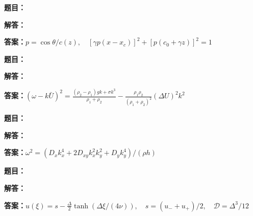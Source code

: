 \documentclass[lang=cn,color=blue,11pt]{elegantbook}
\begin{document}
\par\smallskip\noindent\hrulefill\par\medskip
{}\par
\noindent\textbf{题目：}
\par\noindent\textbf{解答：}
\par\noindent\textbf{答案：}\(\displaystyle p=\cos\theta/c(z),\quad [\gamma p(x-x_c)]^2+[p(c_0+\gamma z)]^2=1\)\par
\par\smallskip\noindent\hrulefill\par\medskip
{}\par
\noindent\textbf{题目：}
\par\noindent\textbf{解答：}
\par\noindent\textbf{答案：}\(\displaystyle (\omega-k\bar U)^2=\frac{(\rho_2-\rho_1)gk+\sigma k^3}{\rho_1+\rho_2}-\frac{\rho_1\rho_2}{(\rho_1+\rho_2)^2}(\Delta U)^2k^2\)\par
\par\smallskip\noindent\hrulefill\par\medskip
{}\par
\noindent\textbf{题目：}
\par\noindent\textbf{解答：}
\par\noindent\textbf{答案：}\(\displaystyle \omega^2=(D_xk_x^4+2D_{xy}k_x^2k_y^2+D_yk_y^4)/(\rho h)\)\par
\par\smallskip\noindent\hrulefill\par\medskip
{}\par
\noindent\textbf{题目：}
\par\noindent\textbf{解答：}
\par\noindent\textbf{答案：}\(\displaystyle u(\xi)=s-\frac{\Delta}{2}\tanh(\Delta\xi/(4\nu)),\quad s=(u_-+u_+)/2,\quad\mathcal D=\Delta^3/12\)\par
\end{document}

